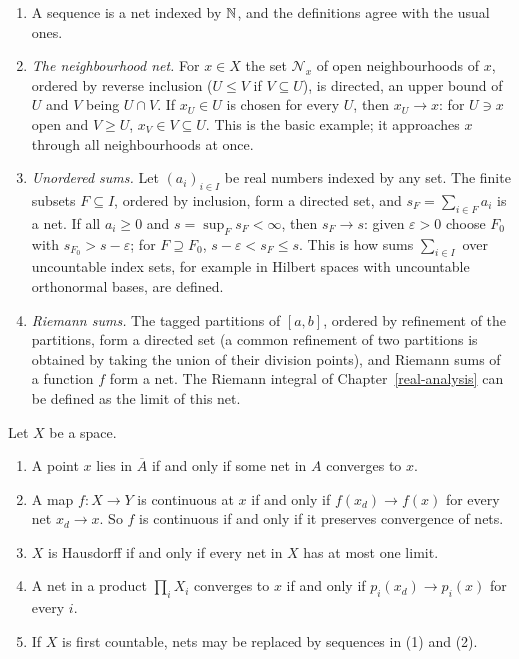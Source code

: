 \begin{example}\label{general-topology:example-nets}
\begin{enumerate}
\item A sequence is a net indexed by $\mathbb{N}$, and the definitions agree with the usual ones.
\item \emph{The neighbourhood net.} For $x \in X$ the set $\mathcal{N}_x$ of open neighbourhoods of $x$, ordered by reverse inclusion ($U \leq V$ if $V \subseteq U$), is directed, an upper bound of
$U$ and $V$ being $U \cap V$. If $x_U \in U$ is chosen for every $U$, then $x_U \to x$: for $U \ni x$ open and $V \geq U$, $x_V \in V \subseteq U$. This is the basic example; it approaches $x$
through all neighbourhoods at once.
\item \emph{Unordered sums.} Let $(a_i)_{i \in I}$ be real numbers indexed by any set. The finite subsets $F \subseteq I$, ordered by inclusion, form a directed set, and $s_F = \sum_{i \in F}a_i$ is a
net. If all $a_i \geq 0$ and $s = \sup_Fs_F < \infty$, then $s_F \to s$: given $\varepsilon > 0$ choose $F_0$ with $s_{F_0} > s - \varepsilon$; for $F \supseteq F_0$, $s - \varepsilon < s_F \leq s$. This is how
sums $\sum_{i \in I}$ over uncountable index sets, for example in Hilbert spaces with uncountable orthonormal bases, are defined.
\item \emph{Riemann sums.} The tagged partitions of $[a, b]$, ordered by refinement of the partitions, form a directed set (a common refinement of two partitions is obtained by taking the union of their
division points), and Riemann sums of a function $f$ form a net. The Riemann integral of Chapter~\ref{real-analysis} can be defined as the limit of this net.
\end{enumerate}
\end{example}

\begin{proposition}\label{general-topology:proposition-nets}
Let $X$ be a space.
\begin{enumerate}
\item A point $x$ lies in $\overline{A}$ if and only if some net in $A$ converges to $x$.
\item A map $f \colon X \to Y$ is continuous at $x$ if and only if $f(x_d) \to f(x)$ for every net $x_d \to x$. So $f$ is continuous if and only if it preserves convergence of nets.
\item $X$ is Hausdorff if and only if every net in $X$ has at most one limit.
\item A net in a product $\prod_iX_i$ converges to $x$ if and only if $p_i(x_d) \to p_i(x)$ for every $i$.
\item If $X$ is first countable, nets may be replaced by sequences in (1) and (2).
\end{enumerate}
\end{proposition}

